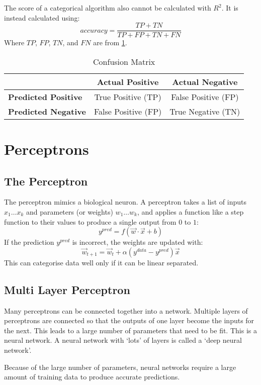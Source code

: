 The score of a categorical algorithm also cannot be calculated with \(R^2\). It is instead calculated using:
\begin{equation}
    accuracy = \frac{TP + TN}{TP + FP + TN + FN}
\end{equation}
Where \(TP\), \(FP\), \(TN\), and \(FN\) are from \cref{tab:confusion_matrix}.

\begin{table}[htbp]
    \centering
    \begin{tabular}{lcc}
        \toprule
                                    & \textbf{Actual Positive} & \textbf{Actual Negative} \\
        \midrule
        \textbf{Predicted Positive} & True Positive (TP)       & False Positive (FP)      \\
        \textbf{Predicted Negative} & False Positive (FP)      & True Negative (TN)       \\
        \bottomrule
    \end{tabular}
    \caption{Confusion Matrix}
    \label{tab:confusion_matrix}
\end{table}

\section{Perceptrons}
\subsection{The Perceptron}
The perceptron mimics a biological neuron. A perceptron takes a list of inputs \(x_1 \dots x_k\) and parameters (or weights) \(w_1 \dots w_k\), and applies a function like a step function to their values to produce a single output from \(0\) to \(1\):
\begin{equation}
    \label{eq:perceptron_prediction}
    y^{pred} = f(\vec{w} \cdot \vec{x} + b)
\end{equation}
If the prediction \(y^{pred}\) is incorrect, the weights are updated with:
\begin{equation}
    \label{eq:perceptron_updating}
    \vec{w}_{t+1} = \vec{w}_t + \alpha(y^{data} - y^{pred})\vec{x}
\end{equation}
This can categorise data well only if it can be linear separated.

\subsection{Multi Layer Perceptron}
Many perceptrons can be connected together into a network. Multiple layers of perceptrons are connected so that the outputs of one layer become the inputs for the next. This leads to a large number of parameters that need to be fit. This is a neural network. A neural network with `lots' of layers is called a `deep neural network'.

Because of the large number of parameters, neural networks require a large amount of training data to produce accurate predictions.
